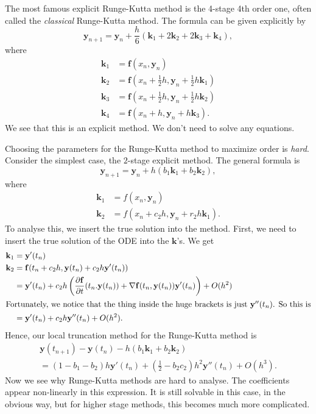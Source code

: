 \documentclass[a4paper]{article}
\begin{document}
\begin{eg}
  The most famous explicit Runge-Kutta method is the 4-stage 4th order one, often called the \emph{classical} Runge-Kutta method. The formula can be given explicitly by
  \[
    \mathbf{y}_{n + 1} = \mathbf{y}_n + \frac{h}{6}(\mathbf{k}_1 + 2\mathbf{k}_2 + 2\mathbf{k}_3 + \mathbf{k}_4),
  \]
  where
  \begin{align*}
    \mathbf{k}_1 &= \mathbf{f}(x_n, \mathbf{y}_n)\\
    \mathbf{k}_2 &= \mathbf{f}\left(x_n + \frac{1}{2}h, \mathbf{y}_n + \frac{1}{2}h \mathbf{k}_1\right)\\
    \mathbf{k}_3 &= \mathbf{f}\left(x_n + \frac{1}{2}h, \mathbf{y}_n + \frac{1}{2}h \mathbf{k}_2\right)\\
    \mathbf{k}_4 &= \mathbf{f}\left(x_n + h, \mathbf{y}_n + h \mathbf{k}_3\right).
  \end{align*}
  We see that this is an explicit method. We don't need to solve any equations.
\end{eg}
Choosing the parameters for the Runge-Kutta method to maximize order is \emph{hard}. Consider the simplest case, the $2$-stage explicit method. The general formula is
\[
  \mathbf{y}_{n + 1} = \mathbf{y}_n + h(b_1 \mathbf{k}_1 + b_2 \mathbf{k}_2),
\]
where
\begin{align*}
  \mathbf{k}_1 &= f(x_n, \mathbf{y}_n)\\
  \mathbf{k}_2 &= f(x_n + c_2 h, \mathbf{y}_n + r_2 h\mathbf{k}_1).
\end{align*}
To analyse this, we insert the true solution into the method. First, we need to insert the true solution of the ODE into the $\mathbf{k}$'s. We get
\begin{align*}
  \mathbf{k}_1 &= \mathbf{y}'(t_n)\\
  \mathbf{k}_2 &= \mathbf{f}(t_n + c_2 h, \mathbf{y}(t_n) + c_2 h \mathbf{y}'(t_n))\\
  &= \mathbf{y}'(t_n) + c_2 h \left(\frac{\partial \mathbf{f}}{\partial t}(t_n. \mathbf{y} (t_n)) + \nabla \mathbf{f}(t_n, \mathbf{y}(t_n)) \mathbf{y}'(t_n)\right) + O(h^2)\\
  \intertext{Fortunately, we notice that the thing inside the huge brackets is just $\mathbf{y}''(t_n)$. So this is}
  &= \mathbf{y}'(t_n) + c_2 h \mathbf{y}''(t_n) + O(h^2).
\end{align*}
Hence, our local truncation method for the Runge-Kutta method is
\begin{multline*}
  \mathbf{y}(t_{n + 1}) - \mathbf{y}(t_n) - h(b_1 \mathbf{k}_1 + b_2 \mathbf{k}_2) \\
  = (1 - b_1 - b_2)h \mathbf{y}'(t_n) + \left(\frac{1}{2} - b_2 c_2\right) h^2 \mathbf{y}''(t_n) + O(h^3).
\end{multline*}
Now we see why Runge-Kutta methods are hard to analyse. The coefficients appear non-linearly in this expression. It is still solvable in this case, in the obvious way, but for higher stage methods, this becomes much more complicated.
\end{document}
